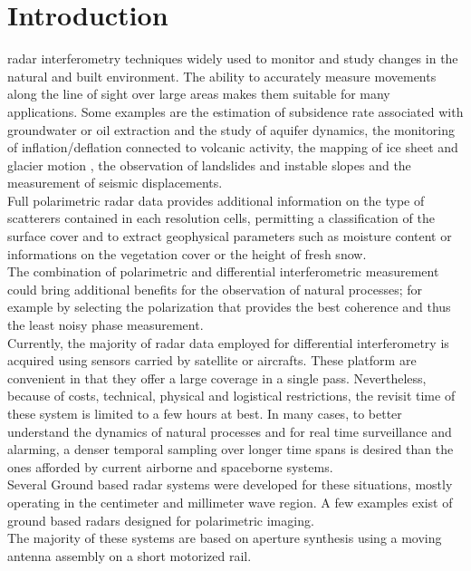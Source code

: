 \section{Introduction}
 radar interferometry\cite{Gabriel1989, Massonnet1993} techniques widely used  to monitor and study changes in the natural and built environment. The ability to accurately measure movements along the line of sight over large areas makes them suitable for many applications. Some examples are the estimation of subsidence rate associated with groundwater or oil extraction and the study of aquifer dynamics\cite{Fielding1998,Strozzi2001,Galloway2007a}, the monitoring of inflation/deflation connected to volcanic activity\cite{Massonnet1995}, the mapping of ice sheet and glacier motion\cite{Goldstein1993,Mohr1998} , the observation of landslides and instable slopes\cite{Carnec1996,Catani2005} and the measurement of seismic displacements\cite{Massonnet1993b,Zebker1994}.\\
Full polarimetric radar data provides additional information on the type of scatterers contained in each resolution cells, permitting a classification of the surface cover\cite{Cloude1997, Lee1999} and to extract geophysical parameters such as moisture content\cite{Hajnsek2003} or informations on the vegetation cover\cite{Ulaby1987} or the height of fresh snow\cite{Leinss2014}.\\
The combination of polarimetric and differential interferometric measurement could bring additional benefits for the observation of natural processes; for example by selecting the polarization that provides the best coherence and thus the least noisy phase measurement\cite{Pipia2009a, Iglesias2014b}.\\
Currently, the majority of radar data employed for differential interferometry is acquired using sensors carried by satellite or aircrafts. These platform are convenient in that they offer a large coverage in a single pass. Nevertheless, because of costs, technical, physical and logistical restrictions, the revisit time of these system is limited to a few hours at best. 
In many cases, to better understand the dynamics of natural processes and for real time surveillance and alarming, a denser temporal sampling over longer time spans is desired than the ones afforded by current airborne and spaceborne systems.\\
Several Ground based radar systems were developed for these situations, mostly operating in the centimeter and millimeter wave region. A few examples exist of ground based radars designed  for polarimetric imaging\cite{Iglesias2014,LEE, Kang2009}.\\
The majority of these systems\cite{Rudolf1999a, Rodelsperger2011, Aguasca2004,Rodelsperger2012} are based on aperture synthesis using a moving antenna assembly on a short motorized rail.
